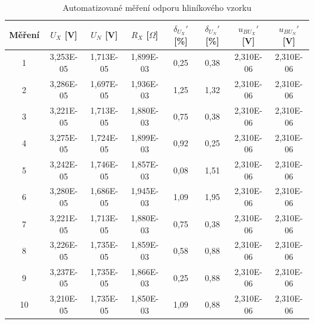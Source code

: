 \documentclass[a4paper, czech]{article}
\begin{document}
\begin{table}[H]
    \centering
    \caption{Automatizované měření odporu hliníkového vzorku}
    \begin{tabular}{>{\columncolor{cyan!20}}c>{\columncolor{cyan!20}}c>{\columncolor{cyan!20}}c>{\columncolor{cyan!20}}ccccc}
        \hline
        \rowcolor{cyan} Měření & $U_X$ {[}V{]} & $U_N$ {[}V{]} & $R_X$ {[}$\Omega${]} & $\delta_{U_X}'$ {[}\%{]} & $\delta_{U_N}'$ {[}\%{]} & $u_{BU_X}'$ {[}V{]} & $u_{BU_N}'$ {[}V{]} \\
        \hline
        1      & 3,253E-05  & 1,713E-05  & 1,899E-03    & 0,25          & 0,38          & 2,310E-06     & 2,310E-06     \\
        2      & 3,286E-05  & 1,697E-05  & 1,936E-03    & 1,25          & 1,32          & 2,310E-06     & 2,310E-06     \\
        3      & 3,221E-05  & 1,713E-05  & 1,880E-03    & 0,75          & 0,38          & 2,310E-06     & 2,310E-06     \\
        4      & 3,275E-05  & 1,724E-05  & 1,899E-03    & 0,92          & 0,25          & 2,310E-06     & 2,310E-06     \\
        5      & 3,242E-05  & 1,746E-05  & 1,857E-03    & 0,08          & 1,51          & 2,310E-06     & 2,310E-06     \\
        6      & 3,280E-05  & 1,686E-05  & 1,945E-03    & 1,09          & 1,95          & 2,310E-06     & 2,310E-06     \\
        7      & 3,221E-05  & 1,713E-05  & 1,880E-03    & 0,75          & 0,38          & 2,310E-06     & 2,310E-06     \\
        8      & 3,226E-05  & 1,735E-05  & 1,859E-03    & 0,58          & 0,88          & 2,310E-06     & 2,310E-06     \\
        9      & 3,237E-05  & 1,735E-05  & 1,866E-03    & 0,25          & 0,88          & 2,310E-06     & 2,310E-06     \\
        10     & 3,210E-05  & 1,735E-05  & 1,850E-03    & 1,09          & 0,88          & 2,310E-06     & 2,310E-06 \\
        \hline
    \end{tabular}


\end{table}
\end{document}
